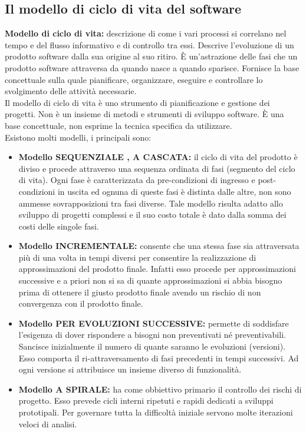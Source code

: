 \subsection{Il modello di ciclo di vita del software}
\textbf{Modello di ciclo di vita:} descrizione di come i vari processi si correlano nel tempo e del flusso informativo e di controllo tra essi. Descrive l'evoluzione di un prodotto software dalla sua origine al suo ritiro. \`E un'astrazione delle fasi che un prodotto software attraversa da quando nasce a quando sparisce. Fornisce la base concettuale sulla quale pianificare, organizzare, eseguire e controllare lo svolgimento delle attività necessarie.\\
Il modello di ciclo di vita è uno strumento di pianificazione e gestione dei progetti. Non è un insieme di metodi e strumenti di sviluppo software. \`E una base concettuale, non esprime la tecnica specifica da utilizzare.\\
Esistono molti modelli, i principali sono:
\begin{itemize}
\item \textbf{Modello SEQUENZIALE , A CASCATA:} il ciclo di vita del prodotto è diviso e procede attraverso
una sequenza ordinata di fasi (segmento del ciclo di vita). Ogni fase è caratterizzata da pre-condizioni di ingresso e post-condizioni in uscita ed ognuna di queste fasi è distinta dalle altre, non sono ammesse sovrapposizioni tra fasi diverse. Tale modello risulta adatto allo sviluppo di progetti complessi e il suo costo totale è dato dalla somma dei costi delle singole fasi.
\item \textbf{Modello INCREMENTALE:} consente che una stessa fase sia attraversata più di una volta in tempi diversi per consentire la realizzazione di approssimazioni del prodotto finale. Infatti esso procede per approssimazioni successive e a priori non si sa di quante approssimazioni si abbia bisogno prima di ottenere il giusto prodotto finale avendo un rischio di non convergenza con il prodotto finale.
\item \textbf{Modello PER EVOLUZIONI SUCCESSIVE:} permette di soddisfare l'esigenza di dover rispondere a bisogni non preventivati né preventivabili. Sancisce inizialmente il numero di quante saranno le evoluzioni (versioni). Esso comporta il ri-attraversamento di fasi precedenti in tempi successivi. Ad ogni versione si attribuisce un insieme diverso di funzionalità.
\item \textbf{Modello A SPIRALE:} ha come obbiettivo primario il controllo dei rischi di progetto. Esso prevede cicli interni ripetuti e rapidi dedicati a sviluppi prototipali. Per governare tutta la difficoltà iniziale servono molte iterazioni veloci di analisi.
\end{itemize}

